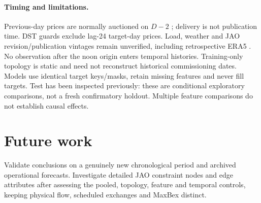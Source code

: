 {\paragraph{Timing and limitations.} Previous-day prices are normally auctioned on $D-2$ \cite{auction}; delivery is not publication time. DST guards exclude lag-24 target-day prices. Load, weather and JAO revision/publication vintages remain unverified, including retrospective ERA5 \cite{era5}. No observation after the noon origin enters temporal histories. Training-only topology is static and need not reconstruct historical commissioning dates. Models use identical target keys/masks, retain missing features and never fill targets. Test has been inspected previously: these are conditional exploratory comparisons, not a fresh confirmatory holdout. Multiple feature comparisons do not establish causal effects.
\section{Future work} Validate conclusions on a genuinely new chronological period and archived operational forecasts. Investigate detailed JAO constraint nodes and edge attributes after assessing the pooled, topology, feature and temporal controls, keeping physical flow, scheduled exchanges and MaxBex distinct.
}
